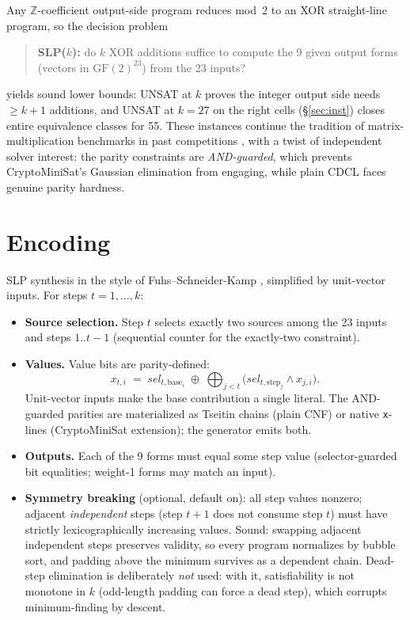 \documentclass[conference]{IEEEtran}
\begin{document}
Any $\mathbb{Z}$-coefficient output-side program reduces mod~2 to an
XOR straight-line program, so the decision problem
\begin{quote}
\textbf{SLP($k$):} do $k$ XOR additions suffice to compute the 9
given output forms (vectors in $\mathrm{GF}(2)^{23}$) from the 23
inputs?
\end{quote}
yields sound lower bounds: UNSAT at $k$ proves the integer output
side needs $\ge k{+}1$ additions, and UNSAT at $k=27$ on the right
cells (\S\ref{sec:inst}) closes entire equivalence classes
for 55. These instances
continue the tradition of matrix-multiplication benchmarks in past
competitions \cite{hks}, with a twist of independent solver
interest: the parity constraints are \emph{AND-guarded}, which
prevents CryptoMiniSat's Gaussian elimination from engaging, while
plain CDCL faces genuine parity hardness.

\section{Encoding}

SLP synthesis in the style of Fuhs--Schneider-Kamp \cite{fsk},
simplified by unit-vector inputs. For steps $t = 1,\dots,k$:

\begin{itemize}
\item \textbf{Source selection.} Step $t$ selects exactly two
  sources among the 23 inputs and steps $1..t{-}1$ (sequential
  counter for the exactly-two constraint).
\item \textbf{Values.} Value bits are parity-defined:
  \[
  x_{t,i} \;=\; \mathit{sel}_{t,\mathrm{base}_i} \;\oplus\;
  \bigoplus_{j<t} \bigl(\mathit{sel}_{t,\mathrm{step}_j} \wedge
  x_{j,i}\bigr).
  \]
  Unit-vector inputs make the base contribution a single literal.
  The AND-guarded parities are materialized as Tseitin chains
  (plain CNF) or native \texttt{x}-lines (CryptoMiniSat extension);
  the generator emits both.
\item \textbf{Outputs.} Each of the 9 forms must equal some step
  value (selector-guarded bit equalities; weight-1 forms may match
  an input).
\item \textbf{Symmetry breaking} (optional, default on): all step
  values nonzero; adjacent \emph{independent} steps (step $t{+}1$
  does not consume step $t$) must have strictly lexicographically
  increasing values. Sound: swapping adjacent independent steps
  preserves validity, so every program normalizes by bubble sort,
  and padding above the minimum survives as a dependent chain.
  Dead-step elimination is deliberately \emph{not} used: with it,
  satisfiability is not monotone in $k$ (odd-length padding can
  force a dead step), which corrupts minimum-finding by descent.
\end{itemize}
\end{document}
